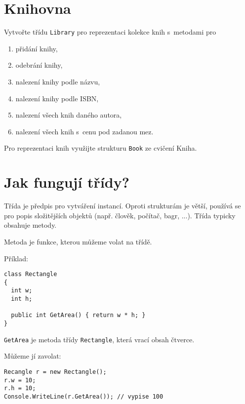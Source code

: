 \documentclass[12pt,a4paper]{article}
\begin{document}
\section{Knihovna}

Vytvořte třídu \texttt{Library} pro reprezentaci kolekce knih s metodami pro
\begin{enumerate}
	\setlength\itemsep{0em}
	\setlength{\parskip}{0pt}
	\item přidání knihy,
	\item odebrání knihy,
	\item nalezení knihy podle názvu,
	\item nalezení knihy podle ISBN,
	\item nalezení všech knih daného autora,
	\item nalezení všech knih s cenu pod zadanou mez.
\end{enumerate}

Pro reprezentaci knih využijte strukturu \texttt{Book} ze cvičení Kniha.


\newpage

\section*{Jak fungují třídy?}

Třída je předpis pro vytváření instancí. Oproti strukturám je větší, používá
se pro popis složitějších objektů (např. člověk, počítač, bagr, ...). Třída
typicky obsahuje metody.

Metoda je funkce, kterou můžeme volat na třídě.

Příklad:

\begin{verbatim}
class Rectangle
{
  int w;
  int h;

  public int GetArea() { return w * h; }
}
\end{verbatim}

\texttt{GetArea} je metoda třídy \texttt{Rectangle}, která vrací obsah čtverce.

Můžeme jí zavolat:

\begin{verbatim}
Recangle r = new Rectangle();
r.w = 10;
r.h = 10;
Console.WriteLine(r.GetArea()); // vypise 100
\end{verbatim}
\end{document}
